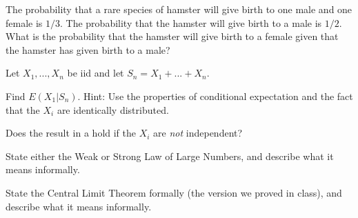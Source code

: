 \documentclass{article}
\begin{document}
\begin{problem}{5}
The probability that a rare species of hamster will give birth to one male and one female is $1/3$. The probability that the hamster will give birth to a male is $1/2$. What is the probability that the hamster will give birth to a female given that the hamster has given birth to a male? 
\end{problem}


\begin{problem}{10}
Let $X_1,...,X_n$ be iid and let $S_n =X_1+...+X_n$. 

\vspace{1pc}

Find $E(X_1|S_n)$. Hint: Use the properties of conditional expectation and the fact that the $X_i$ are identically distributed.

\vspace{1pc}


Does the result in a hold if the $X_i$ are \emph{not} independent?
\end{problem}

\begin{problem}{5}
State either the Weak or Strong Law of Large Numbers, and describe what it means informally. 

\vspace{1pc}

\end{problem}

\begin{problem}{5}
State the Central Limit Theorem formally (the version we proved in class), and describe what it means informally. 

\vspace{1pc}

\end{problem}



\showpoints
\end{document}
